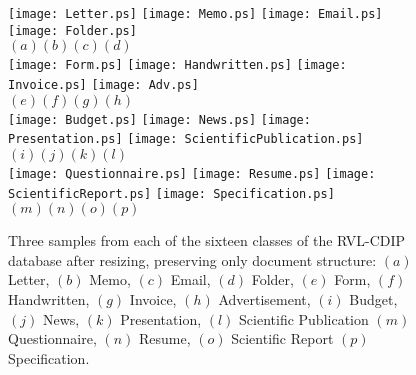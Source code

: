 \documentclass[10pt,conference,a4paper]{IEEEtran}
\newcommand\blfootnote[1]{%
	\begingroup
	\renewcommand\thefootnote{}\footnote{#1}%
	\addtocounter{footnote}{-1}%
	\endgroup
}
\begin{document}

\begin{figure*}[t]
	\begin{center}
		\texttt{[image: Letter.ps]}
		\hfill  \texttt{[image: Memo.ps]}
		\hfill  \texttt{[image: Email.ps]}
		\hfill  \texttt{[image: Folder.ps]}\\
		$(a)$\hspace*{4cm}$(b)$\hspace*{4cm}$(c)$\hspace*{4cm}$(d)$\\
		\vspace*{.25cm}
		\texttt{[image: Form.ps]}
		\hfill  \texttt{[image: Handwritten.ps]}
		\hfill  \texttt{[image: Invoice.ps]}
		\hfill  \texttt{[image: Adv.ps]}\\
		$(e)$\hspace*{4cm}$(f)$\hspace*{4cm}$(g)$\hspace*{4cm}$(h)$\\
		\vspace*{.25cm}
		\texttt{[image: Budget.ps]}
		\hfill  \texttt{[image: News.ps]}
		\hfill  \texttt{[image: Presentation.ps]}
		\hfill  \texttt{[image: ScientificPublication.ps]}\\
		$(i)$\hspace*{4cm}$(j)$\hspace*{4cm}$(k)$\hspace*{4cm}$(l)$\\
		\vspace*{.25cm}
		\texttt{[image: Questionnaire.ps]}
		\hfill  \texttt{[image: Resume.ps]}
		\hfill  \texttt{[image: ScientificReport.ps]}
		\hfill  \texttt{[image: Specification.ps]}\\
		$(m)$\hspace*{4cm}$(n)$\hspace*{4cm}$(o)$\hspace*{4cm}$(p)$\\
		\caption{Three samples from each of the sixteen classes of the RVL-CDIP database after resizing, preserving only document structure: $(a)$ Letter, $(b)$ Memo, $(c)$ Email, $(d)$ Folder, $(e)$ Form, $(f)$ Handwritten, $(g)$ Invoice, $(h)$ Advertisement, $(i)$ Budget, $(j)$ News, $(k)$ Presentation, $(l)$ Scientific Publication $(m)$ Questionnaire, $(n)$ Resume, $(o)$ Scientific Report $(p)$ Specification.} \label{fig:datasheet}
	\end{center}
	\vspace*{-3mm}
\end{figure*}
\end{document}
